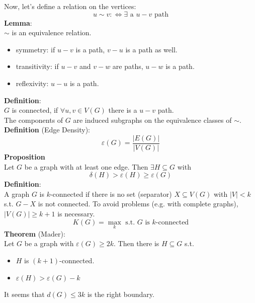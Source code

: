 \documentclass[a4paper, 12pt]{article}
\begin{document}
	Now, let's define a relation on the vertices: \[u\sim v :\Leftrightarrow \exists \text{ a $u-v$ path}\]
	\textbf{Lemma}:\\
	$\sim$ is an equivalence relation.
	\begin{itemize}
		\item symmetry: if $u-v$ is a path, $v-u$ is a path as well.
		\item transitivity: if $u-v$ and $v-w$ are paths, $u-w$ is a path.
		\item reflexivity: $u-u$ is a path.
	\end{itemize}
	\textbf{Definition}:\\
	$G$ is connected, if $\forall u,v \in V(G)$ there is a $u-v$ path.\\
	The components of $G$ are induced subgraphs on the equivalence classes of $\sim$.\\
	\textbf{Definition} (Edge Density):
	\[\varepsilon(G) = \frac{\left|E(G)\right|}{\left|V(G)\right|}\]
	\textbf{Proposition}\\
	Let $G$ be a graph with at least one edge. Then $\exists H \subseteq G$ with \[\delta(H) > \varepsilon(H) \geq \varepsilon(G)\]
	\textbf{Definition}:\\
	A graph $G$ is $k$-connected if there is no set (separator) $X\subseteq V(G)$ with $\left|V\right|<k$ s.t. $G-X$ is not connected. To avoid problems (e.g. with complete graphs), $\left|V(G)\right|\geq k+1$ is necessary.
	\[K(G) = \max_k \text{ s.t. $G$ is $k$-connected}\]
	\textbf{Theorem} (Mader):\\
	Let $G$ be a graph with $\varepsilon(G) \geq 2k$. Then there is $H \subseteq G$ s.t. \begin{itemize}
		\item $H$ is $(k+1)$-connected.
		\item $\varepsilon(H) > \varepsilon(G)-k$
	\end{itemize} 
	It seems that $d(G) \leq 3k$ is the right boundary.\\
	
\end{document}
